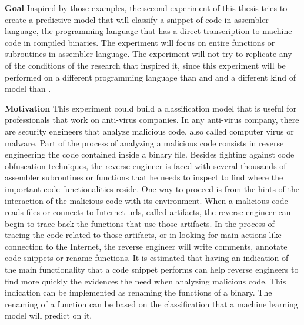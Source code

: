 \textbf{Goal}
Inspired by those examples, the second experiment of this thesis tries to create a predictive model that will classify a snippet of code in assembler language, the programming language that has a direct transcription to machine code in compiled binaries. The experiment will focus on entire functions or subroutines in assembler language. The experiment will not try to replicate any of the conditions of the research that inspired it, since this experiment will be performed on a different programming language than \cite{139} and \cite{code2vec} and a different kind of model than \cite{code2vec}.

\textbf{Motivation}
This experiment could build a classification model that is useful for professionals that work on anti-virus companies. In any anti-virus company, there are security engineers that analyze malicious code, also called computer virus or malware. Part of the process of analyzing a malicious code consists in reverse engineering the code contained inside a binary file. Besides fighting against code obfuscation techniques, the reverse engineer is faced with several thousands of assembler subroutines or functions that he needs to inspect to find where the important code functionalities reside. One way to proceed is from the hints of the interaction of the malicious code with its environment. When a malicious code reads files or connects to Internet urls, called artifacts, the reverse engineer can begin to trace back the functions that use those artifacts. In the process of tracing the code related to those artifacts, or in looking for main actions like connection to the Internet, the reverse engineer will write comments, annotate code snippets or rename functions.
It is estimated that having an indication of the main functionality that a code snippet performs can help reverse engineers to find more quickly the evidences the need when analyzing malicious code. This indication can be implemented as renaming the functions of a binary. The renaming of a function can be based on the classification that a machine learning model will predict on it.



